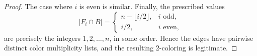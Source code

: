 \documentclass[10pt]{article}
\theoremstyle{definition}
\begin{document}
\begin{proof}
		
		The case where $i$ is even is similar.
		Finally, the prescribed values \[ |F_i\cap B|= \begin{cases} n-\lfloor i/2\rfloor, & i \text{ odd},\\ i/2, & i \text{ even}, \end{cases} \] are precisely the integers \(1,2,\ldots,n\), in some order. Hence the edges have pairwise distinct color multiplicity lists, and the resulting 2-coloring is legitimate.
	\end{proof}
	
	
	
	
\end{document}
